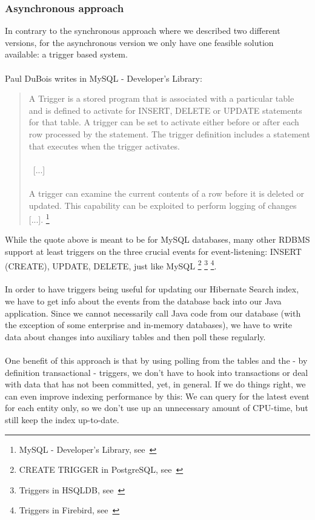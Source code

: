 \subsubsection{Asynchronous approach}\label{async_approach}
In contrary to the synchronous approach where we described two different versions, for the asynchronous version we only have one feasible solution available: a trigger based system.
\\\\
Paul DuBois writes in MySQL - Developer's Library:
\begin{quote}
	A Trigger is a stored program that is associated with a particular table and is defined to activate for INSERT, DELETE or UPDATE statements for that table. A trigger can be set to activate either before or after each row processed by the statement. The trigger definition includes a statement that executes when the trigger activates.
	\\\\
	~[...]~
	\\\\
	A trigger can examine the current contents of a row before it is deleted or updated. This capability can be exploited to perform logging of changes [...].
	\footnote{MySQL - Developer's Library, see~\cite{mysql_developers_lib}}
\end{quote}
\noindent
While the quote above is meant to be for MySQL databases, many other RDBMS support at least triggers on the three crucial events for event-listening: INSERT (CREATE), UPDATE, DELETE, just like MySQL \footnote{CREATE TRIGGER in PostgreSQL, see~\cite{postgres_triggers}} \footnote{Triggers in HSQLDB, see~\cite{hsqldb_triggers}} \footnote{Triggers in Firebird, see~\cite{firebird_triggers}}.
\\\\
In order to have triggers being useful for updating our Hibernate Search index, we have to get info about the events from the database back into our Java application. Since we cannot necessarily call Java code from our database (with the exception of some enterprise and in-memory databases), we have to write data about changes into auxiliary tables and then poll these regularly.
\\\\
One benefit of this approach is that by using polling from the tables and the - by definition transactional - triggers, we don't have to hook into transactions or deal with data that has not been committed, yet, in general. If we do things right, we can even improve indexing performance by this: We can query for the latest event for each entity only, so we don't use up an unnecessary amount of CPU-time, but still keep the index up-to-date.

